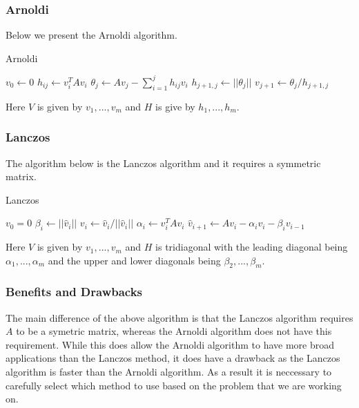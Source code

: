\subsubsection{Arnoldi}
Below we present the Arnoldi algorithm.
\begin{algorithm}[H]
\caption{Arnoldi \cite{Fan2018}} %
\begin{algorithmic}
\State $v_0 \gets 0$
\State$h_{ij} \gets v_i^T A v_i$
\EndFor
\State$\theta_j \gets Av_j - \sum^j_{i=1} h_{ij}v_i$
\State$h_{j+1,j} \gets ||\theta_j||$
\State$v_{j+1} \gets \theta_j/h_{j+1,j}$
\EndFor
\EndProcedure
\end{algorithmic}
\end{algorithm}
Here $V$ is given by $v_1,...,v_m$ and $H$ is give by $h_1,...,h_m$.\\

\subsubsection{Lanczos}
The algorithm below is the Lanczos algorithm and it requires a symmetric matrix. \cite{Moler2003}
\begin{algorithm}[H]
\caption{Lanczos \cite{OJALVO1970}}
\begin{algorithmic}
\State $v_0 = 0$
\State$\beta_i \gets || \hat v_i ||$
\State$v_i \gets \hat v_i / || \hat v_i ||$
\State$\alpha_i \gets v_i^T A v_i$
\State$\hat v_{i+1} \gets Av_i - \alpha_iv_i - \beta_iv_{i-1}$
\EndFor
\EndProcedure
\end{algorithmic}
\end{algorithm}
Here $V$ is given by ${v_1,...,v_m}$ and $H$ is tridiagonal with the leading diagonal being $\alpha_1, ..., \alpha_m$ and the upper and lower diagonals being $\beta_2,...,\beta_m$.
\subsubsection{Benefits and Drawbacks}
The main difference of the above algorithm is that the Lanczos algorithm requires $A$ to be a symetric matrix, whereas the Arnoldi algorithm does not have this requirement.
While this does allow the Arnoldi algorithm to have more broad applications than the Lanczos method, it does have a drawback as the Lanczos algorithm is faster than the Arnoldi algorithm.
As a result it is neccessary to carefully select which method to use based on the problem that we are working on.

